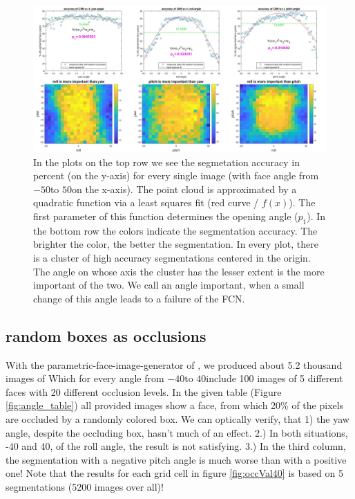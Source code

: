 \begin{figure}[h]
	\centering
	\includegraphics[width=\textwidth]{Figures/evaluation_angles.png}
	\caption{In the plots on the top row we see the segmetation accuracy in percent (on the y-axis) for every single image (with face angle from $-50$\textdegree to $50$\textdegree on the x-axis). The point cloud is approximated by a quadratic function via a least squares fit (red curve / $f(x)$). The first parameter of this function determines the opening angle ($p_1$). In the bottom row the colors indicate the segmentation accuracy. The brighter the color, the better the segmentation. In every plot, there is a cluster of high accuracy segmentations centered in the origin. The angle on whose axis the cluster has the lesser extent is the more important of the two. We call an angle important, when a small change of this angle leads to a failure of the FCN. }
	\label{fig:evaluation_angles}
\end{figure}

\subsection{random boxes as occlusions}
With the parametric-face-image-generator of \cite{parametric}, we produced about 5.2 thousand images of Which for every angle from $-40$\textdegree to $40$\textdegree  include 100 images of 5 different faces with 20 different occlusion levels. In the given table (Figure \ref{fig:angle_table}) all provided images show a face, from which 20\% of the pixels are occluded by a randomly colored box. We can optically verify, that 1) the yaw angle, despite the occluding box, hasn't much of an effect. 2.) In both situations, -40 and 40, of the roll angle, the result is not satisfying. 3.) In the third column, the segmentation with a negative pitch angle is much worse than with a positive one! Note that the results for each grid cell in figure \ref{fig:occVal40} is based on 5 segmentations (5200 images over all)!\\

